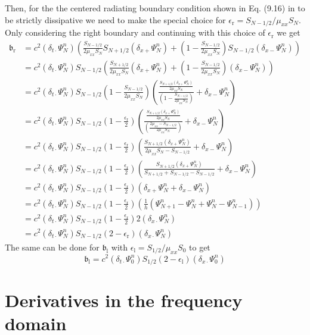 \documentclass[dvipsnames]{article}
\def\dxp{\delta_{x+}}
\def\dxm{\delta_{x-}}
\def\dtd{\delta_{t\cdot}}
\begin{document}
Then, for the the centered radiating boundary condition shown in Eq. (9.16) in \cite{Bilbao2009}  %
to be strictly dissipative we need to make the special choice for $\epsilon_\text{r} = S_{N-1/2} / \mu_{xx}S_N$. Only considering the right boundary and continuing with this choice of $\epsilon_\text{r}$ we get
\begin{equation}
    \begin{aligned}
        \mathfrak{b}_\text{r} &= c^2 (\dtd\Psi_N^n)\left(\frac{S_{N-1/2}}{2\mu_{xx}S_N}S_{N+1/2}(\dxp\Psi_N^n)+\left(1-\frac{S_{N-1/2}}{2\mu_{xx}S_N}\right)S_{N-1/2}(\dxm\Psi_N^n)\right)\\
        &= c^2 (\dtd\Psi_N^n)S_{N-1/2}\left(\frac{S_{N+1/2}}{2\mu_{xx}S_N}(\dxp\Psi_N^n)+\left(1-\frac{S_{N-1/2}}{2\mu_{xx}S_N}\right)(\dxm\Psi_N^n)\right)\\
        &=c^2 (\dtd\Psi_N^n)S_{N-1/2}\left(1-\frac{S_{N-1/2}}{2\mu_{xx}S_N}\right)\left(\frac{\frac{S_{N+1/2}(\dxp\Psi_N^n)}{2\mu_{xx}S_N}}{\left(1-\frac{S_{N-1/2}}{2\mu_{xx}S_N}\right)}+\dxm\Psi_N^n\right)\\
        &=c^2 (\dtd\Psi_N^n)S_{N-1/2}\left(1-\frac{\epsilon_\text{r}}{2}\right)\left(\frac{\frac{S_{N+1/2}(\dxp\Psi_N^n)}{2\mu_{xx}S_N}}{\left(\frac{2\mu_{xx} - S_{N-1/2}}{2\mu_{xx}S_N}\right)}+\dxm\Psi_N^n\right)\\
        &=c^2 (\dtd\Psi_N^n)S_{N-1/2}\left(1-\frac{\epsilon_\text{r}}{2}\right)\left(\frac{S_{N+1/2}(\dxp\Psi_N^n)}{2\mu_{xx}S_N - S_{N-1/2}}+\dxm\Psi_N^n\right)\\
        &=c^2 (\dtd\Psi_N^n)S_{N-1/2}\left(1-\frac{\epsilon_\text{r}}{2}\right)\left(\frac{S_{N+1/2}(\dxp\Psi_N^n)}{S_{N+1/2} + S_{N-1/2} - S_{N-1/2}}+\dxm\Psi_N^n\right)\\
        &=c^2 (\dtd\Psi_N^n)S_{N-1/2}\left(1-\frac{\epsilon_\text{r}}{2}\right)\left(\dxp\Psi_N^n+\dxm\Psi_N^n\right)\\
        &=c^2 (\dtd\Psi_N^n)S_{N-1/2}\left(1-\frac{\epsilon_\text{r}}{2}\right)\left(\frac{1}{h}\left(\Psi_{N+1}^n - \Psi_N^n + \Psi_N^n - \Psi_{N-1}^n\right)\right)\\
&= c^2 (\dtd\Psi_N^n)S_{N-1/2}\left(1-\frac{\epsilon_\text{r}}{2}\right)2(\delta_{x\cdot}\Psi_N^n)\\
&= c^2 (\dtd\Psi_N^n)S_{N-1/2}\left(2-\epsilon_\text{r}\right)(\delta_{x\cdot}\Psi_N^n)
    \end{aligned}
\end{equation}
The same can be done for $\mathfrak{b}_\text{l}$ with $\epsilon_\text{l} = S_{1/2}/\mu_{xx}S_0$ to get
\begin{equation}
    \mathfrak{b}_\text{l} = c^2(\dtd\Psi_0^n)S_{1/2}\left(2-\epsilon_\text{l}\right)(\delta_{x\cdot}\Psi_0^n)
\end{equation}

\section{Derivatives in the frequency domain}
\end{document}
